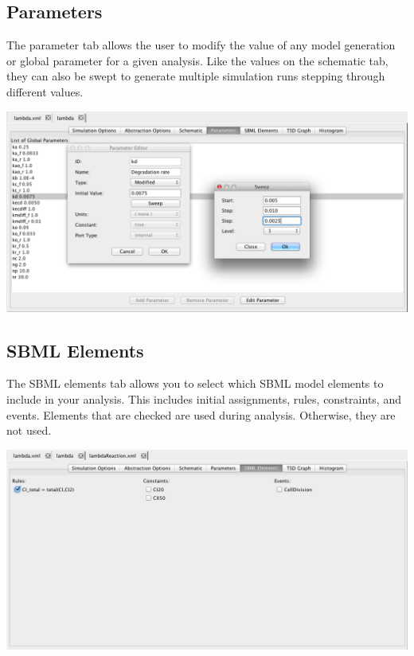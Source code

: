 \documentclass[titlepage,11pt]{article}
\begin{document}
\clearpage

\subsection{\label{AnalysisParameters}Parameters}

\noindent
The parameter tab allows the user to modify the value of any model generation or global parameter for a given analysis.  Like the values on the schematic tab, they can also be swept to generate multiple simulation runs stepping through different values.

\begin{center}
\includegraphics[width=160mm]{screenshots/parameterEditor}
\end{center}

\subsection{\label{SBMLElements}SBML Elements}

\noindent
The SBML elements tab allows you to select which SBML model elements to include in your analysis.  This includes initial assignments, rules, constraints, and events.  Elements that are checked are used during analysis.  Otherwise, they are not used.

\begin{center}
\includegraphics[width=160mm]{screenshots/SBMLElements}
\end{center}
\end{document}
